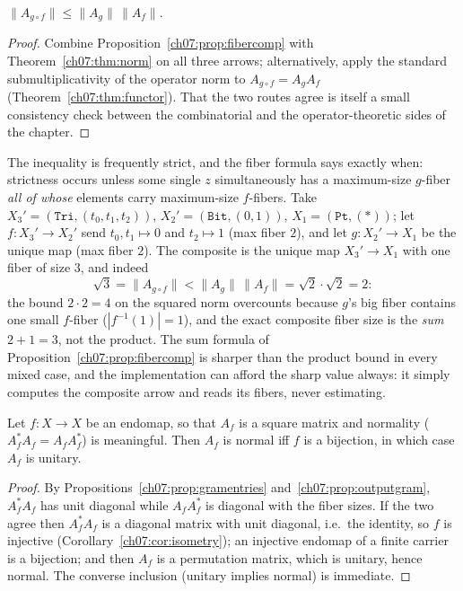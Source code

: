 \begin{corollary}\label{ch07:cor:submult}
$\lVert A_{g\circ f}\rVert\le\lVert A_g\rVert\,\lVert A_f\rVert$.
\end{corollary}

\begin{proof}
Combine Proposition~\ref{ch07:prop:fibercomp} with
Theorem~\ref{ch07:thm:norm} on all three arrows; alternatively, apply the
standard submultiplicativity of the operator norm \cite{horn} to
$A_{g\circ f}=A_gA_f$ (Theorem~\ref{ch07:thm:functor}). That the two routes
agree is itself a small consistency check between the combinatorial and the
operator-theoretic sides of the chapter.
\end{proof}

\begin{example}[Strictness]\label{ch07:ex:strict}
The inequality is frequently strict, and the fiber formula says exactly
when: strictness occurs unless some single $z$ simultaneously has a
maximum-size $g$-fiber \emph{all of whose} elements carry maximum-size
$f$-fibers. Take $X_3'=(\texttt{Tri},(t_0,t_1,t_2))$, $X_2'=(\texttt{Bit},(0,1))$,
$X_1=(\texttt{Pt},(\ast))$; let $f:X_3'\to X_2'$ send $t_0,t_1\mapsto 0$ and
$t_2\mapsto 1$ (max fiber $2$), and let $g:X_2'\to X_1$ be the unique map
(max fiber $2$). The composite is the unique map $X_3'\to X_1$ with one
fiber of size $3$, and indeed
\[
\sqrt3=\lVert A_{g\circ f}\rVert<\lVert A_g\rVert\,\lVert A_f\rVert=\sqrt2\cdot\sqrt2=2 :
\]
the bound $2\cdot 2=4$ on the squared norm overcounts because $g$'s big
fiber contains one small $f$-fiber ($|f^{-1}(1)|=1$), and the exact
composite fiber size is the \emph{sum} $2+1=3$, not the product. The sum
formula of Proposition~\ref{ch07:prop:fibercomp} is sharper than the
product bound in every mixed case, and the implementation can afford the
sharp value always: it simply computes the composite arrow and reads its
fibers, never estimating.
\end{example}

\begin{proposition}\label{ch07:prop:normal}
Let $f:X\to X$ be an endomap, so that $A_f$ is a square matrix and
normality ($A_f^*A_f=A_fA_f^*$) is meaningful. Then $A_f$ is normal iff
$f$ is a bijection, in which case $A_f$ is unitary.
\end{proposition}

\begin{proof}
By Propositions~\ref{ch07:prop:gramentries} and~\ref{ch07:prop:outputgram},
$A_f^*A_f$ has unit diagonal while $A_fA_f^*$ is diagonal with the fiber
sizes. If the two agree then $A_f^*A_f$ is a diagonal matrix with unit
diagonal, i.e.\ the identity, so $f$ is injective
(Corollary~\ref{ch07:cor:isometry}); an injective endomap of a finite
carrier is a bijection; and then $A_f$ is a permutation matrix, which is
unitary, hence normal. The converse inclusion (unitary implies normal) is
immediate.
\end{proof}

